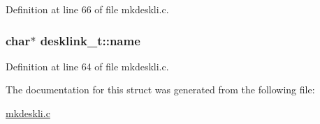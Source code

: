 Definition at line 66 of file mkdeskli.\-c.

\hypertarget{structdesklink__t_a29e2e7839d78d38bd387ce12badd177c}{
\subsubsection[{name}]{\setlength{\rightskip}{0pt plus 5cm}char$\ast$ desklink\-\_\-t\-::name}}\label{structdesklink__t_a29e2e7839d78d38bd387ce12badd177c}


Definition at line 64 of file mkdeskli.\-c.



The documentation for this struct was generated from the following file\-:\begin{DoxyCompactItemize}
\item 
\hyperlink{mkdeskli_8c}{mkdeskli.\-c}\end{DoxyCompactItemize}
